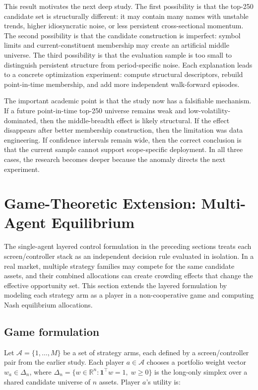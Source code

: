 \documentclass[journal,10pt]{IEEEtran}
\newcommand{\R}{\mathbb{R}}
\begin{document}
This result motivates the next deep study. The first possibility is that the top-250 candidate set is structurally different: it may contain many names with unstable trends, higher idiosyncratic noise, or less persistent cross-sectional momentum. The second possibility is that the candidate construction is imperfect: symbol limits and current-constituent membership may create an artificial middle universe. The third possibility is that the evaluation sample is too small to distinguish persistent structure from period-specific noise. Each explanation leads to a concrete optimization experiment: compute structural descriptors, rebuild point-in-time membership, and add more independent walk-forward episodes.

The important academic point is that the study now has a falsifiable mechanism. If a future point-in-time top-250 universe remains weak and low-volatility-dominated, then the middle-breadth effect is likely structural. If the effect disappears after better membership construction, then the limitation was data engineering. If confidence intervals remain wide, then the correct conclusion is that the current sample cannot support scope-specific deployment. In all three cases, the research becomes deeper because the anomaly directs the next experiment.

\section{Game-Theoretic Extension: Multi-Agent Equilibrium}
The single-agent layered control formulation in the preceding sections treats each screen/controller stack as an independent decision rule evaluated in isolation. In a real market, multiple strategy families may compete for the same candidate assets, and their combined allocations can create crowding effects that change the effective opportunity set. This section extends the layered formulation by modeling each strategy arm as a player in a non-cooperative game and computing Nash equilibrium allocations.

\subsection{Game formulation}
Let $\mathcal{A}=\{1,\dots,M\}$ be a set of strategy arms, each defined by a screen/controller pair from the earlier study. Each player $a\in\mathcal{A}$ chooses a portfolio weight vector $w_a\in\Delta_n$, where $\Delta_n=\{w\in\R^n:\mathbf{1}^\top w=1,\; w\ge0\}$ is the long-only simplex over a shared candidate universe of $n$ assets. Player $a$'s utility is:
\end{document}
